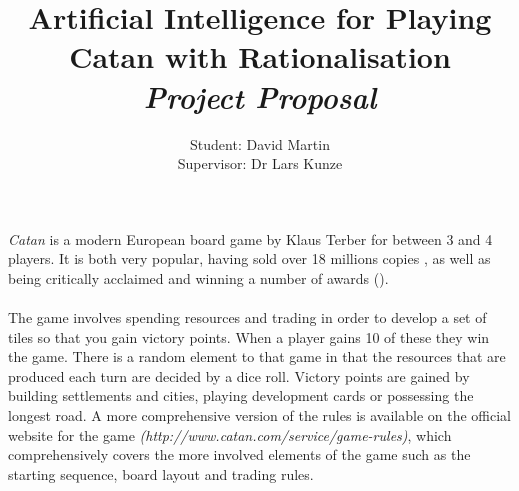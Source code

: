 \documentclass[]{article}
\title{Artificial Intelligence for Playing Catan with Rationalisation
\\ \textit{Project Proposal}}
\author{Student: David Martin 
\\ Supervisor: Dr Lars Kunze}
\date{}
\begin{document}
\maketitle

\section*{}
\paragraph{}
\textit{Catan} is a modern European board game by Klaus Terber for between 3 and 4 players. It is both very popular, having sold over 18 millions copies \autocite{raphel2014man}, as well as being critically acclaimed and winning a number of awards (\citeauthor{bgg1}).

\paragraph{}
The game involves spending resources and trading in order to develop a set of tiles so that you gain victory points. When a player gains 10 of these they win the game. There is a random element to that game in that the resources that are produced each turn are decided by a dice roll. Victory points are gained by building settlements and cities, playing development cards or possessing the longest road. A more comprehensive version of the rules is available on the official website for the game \textit{(http://www.catan.com/service/game-rules)}, which comprehensively covers the more involved elements of the game such as the starting sequence, board layout and trading rules. 
\end{document}
